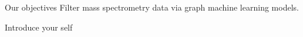 \documentclass[aspectratio=169]{beamer}
\begin{document}
    \begin{frame}{Our objectives}
        Filter mass spectrometry data via graph machine learning models.




        \begin{note}
            {Introduce your self}
        \end{note}
    \end{frame}
\end{document}
